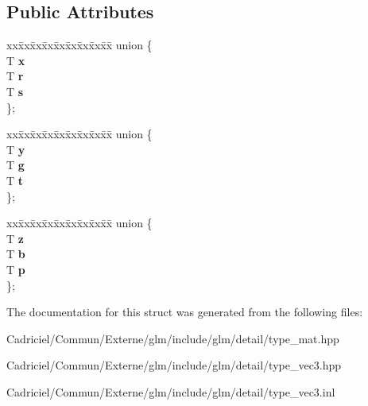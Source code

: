 \subsection*{Public Attributes}
\begin{DoxyCompactItemize}
\item 
\begin{tabbing}
xx\=xx\=xx\=xx\=xx\=xx\=xx\=xx\=xx\=\kill
union \{\\
\>T {\bfseries x}\\
\>T {\bfseries r}\\
\>T {\bfseries s}\\
\}; \hypertarget{structglm_1_1detail_1_1tvec3_a95db915d0bfa833abb7d58b568499f6f}{}\label{structglm_1_1detail_1_1tvec3_a95db915d0bfa833abb7d58b568499f6f}
\\

\end{tabbing}\item 
\begin{tabbing}
xx\=xx\=xx\=xx\=xx\=xx\=xx\=xx\=xx\=\kill
union \{\\
\>T {\bfseries y}\\
\>T {\bfseries g}\\
\>T {\bfseries t}\\
\}; \hypertarget{structglm_1_1detail_1_1tvec3_a7bab71ab14f740a398b2ea319b38be42}{}\label{structglm_1_1detail_1_1tvec3_a7bab71ab14f740a398b2ea319b38be42}
\\

\end{tabbing}\item 
\begin{tabbing}
xx\=xx\=xx\=xx\=xx\=xx\=xx\=xx\=xx\=\kill
union \{\\
\>T {\bfseries z}\\
\>T {\bfseries b}\\
\>T {\bfseries p}\\
\}; \hypertarget{structglm_1_1detail_1_1tvec3_a8155637e491e13ea65ca42b96ccc7360}{}\label{structglm_1_1detail_1_1tvec3_a8155637e491e13ea65ca42b96ccc7360}
\\

\end{tabbing}\end{DoxyCompactItemize}


The documentation for this struct was generated from the following files\+:\begin{DoxyCompactItemize}
\item 
Cadriciel/\+Commun/\+Externe/glm/include/glm/detail/type\+\_\+mat.\+hpp\item 
Cadriciel/\+Commun/\+Externe/glm/include/glm/detail/type\+\_\+vec3.\+hpp\item 
Cadriciel/\+Commun/\+Externe/glm/include/glm/detail/type\+\_\+vec3.\+inl\end{DoxyCompactItemize}
